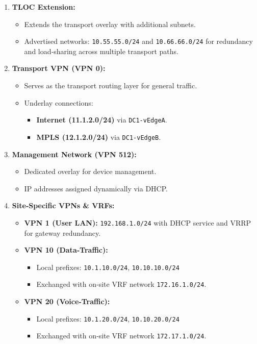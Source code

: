 \documentclass[12pt,english]{report}
\begin{document}
\begin{enumerate}
    \item \textbf{TLOC Extension:}
    \begin{itemize}
        \item Extends the transport overlay with additional subnets.
        \item Advertised networks: \texttt{10.55.55.0/24} and \texttt{10.66.66.0/24} for redundancy and load‑sharing across multiple transport paths.
    \end{itemize}

    \item \textbf{Transport VPN (VPN 0):}
    \begin{itemize}
        \item Serves as the transport routing layer for general traffic.
        \item Underlay connections:
        \begin{itemize}
            \item \textbf{Internet (11.1.2.0/24)} via \texttt{DC1‑vEdgeA}.
            \item \textbf{MPLS (12.1.2.0/24)} via \texttt{DC1‑vEdgeB}.
        \end{itemize}
    \end{itemize}

    \item \textbf{Management Network (VPN 512):}
    \begin{itemize}
        \item Dedicated overlay for device management.
        \item IP addresses assigned dynamically via DHCP.
    \end{itemize}

    \item \textbf{Site‑Specific VPNs \& VRFs:}
    \begin{itemize}
        \item \textbf{VPN 1 (User LAN):} \texttt{192.168.1.0/24} with DHCP service and VRRP for gateway redundancy.
        \item \textbf{VPN 10 (Data‑Traffic):}  
        \begin{itemize}
            \item Local prefixes: \texttt{10.1.10.0/24}, \texttt{10.10.10.0/24}  
            \item Exchanged with on‑site VRF network \texttt{172.16.1.0/24}.
        \end{itemize}
        \item \textbf{VPN 20 (Voice‑Traffic):}  
        \begin{itemize}
            \item Local prefixes: \texttt{10.1.20.0/24}, \texttt{10.10.20.0/24}  
            \item Exchanged with on‑site VRF network \texttt{172.17.1.0/24}.
        \end{itemize}
    \end{itemize}


\end{enumerate}
\end{document}
